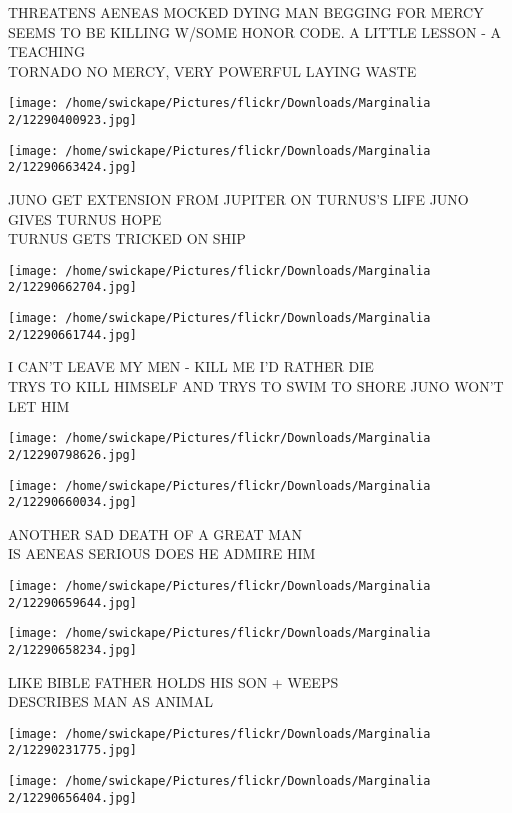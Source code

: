 \documentclass[10pt,letterpaper]{article}
\begin{document}
THREATENS AENEAS MOCKED DYING MAN BEGGING FOR MERCY SEEMS TO BE KILLING W/SOME HONOR CODE. A LITTLE LESSON {-} A TEACHING\\
TORNADO NO MERCY, VERY POWERFUL LAYING WASTE
\pagebreak

\texttt{[image: /home/swickape/Pictures/flickr/Downloads/Marginalia 2/12290400923.jpg]}

\vspace{0.25in}
\texttt{[image: /home/swickape/Pictures/flickr/Downloads/Marginalia 2/12290663424.jpg]}

JUNO GET EXTENSION FROM JUPITER ON TURNUS'S LIFE JUNO GIVES TURNUS HOPE\\
TURNUS GETS TRICKED ON SHIP
\pagebreak

\texttt{[image: /home/swickape/Pictures/flickr/Downloads/Marginalia 2/12290662704.jpg]}

\vspace{0.25in}
\texttt{[image: /home/swickape/Pictures/flickr/Downloads/Marginalia 2/12290661744.jpg]}

I CAN'T LEAVE MY MEN {-} KILL ME I'D RATHER DIE\\
TRYS TO KILL HIMSELF AND TRYS TO SWIM TO SHORE JUNO WON'T LET HIM
\pagebreak

\texttt{[image: /home/swickape/Pictures/flickr/Downloads/Marginalia 2/12290798626.jpg]}

\vspace{0.25in}
\texttt{[image: /home/swickape/Pictures/flickr/Downloads/Marginalia 2/12290660034.jpg]}

ANOTHER SAD DEATH OF A GREAT MAN\\
IS AENEAS SERIOUS DOES HE ADMIRE HIM
\pagebreak

\texttt{[image: /home/swickape/Pictures/flickr/Downloads/Marginalia 2/12290659644.jpg]}

\vspace{0.25in}
\texttt{[image: /home/swickape/Pictures/flickr/Downloads/Marginalia 2/12290658234.jpg]}

LIKE BIBLE FATHER HOLDS HIS SON + WEEPS\\
DESCRIBES MAN AS ANIMAL
\pagebreak

\texttt{[image: /home/swickape/Pictures/flickr/Downloads/Marginalia 2/12290231775.jpg]}

\vspace{0.25in}
\texttt{[image: /home/swickape/Pictures/flickr/Downloads/Marginalia 2/12290656404.jpg]}
\end{document}
